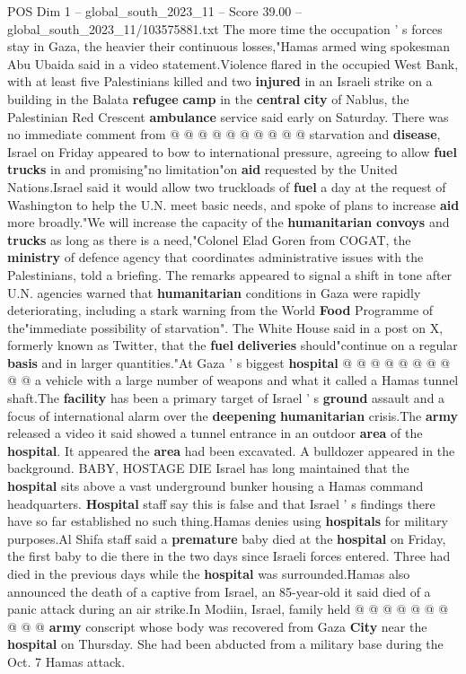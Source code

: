 \begin{textsample}{POS Dim 1 – global\_south\_2023\_11 – Score 39.00 – global\_south\_2023\_11/103575881.txt}
The more time the occupation ' s forces stay in Gaza, the heavier their continuous losses,"Hamas armed wing spokesman Abu Ubaida said in a video statement.Violence flared in the occupied West Bank, with at least five Palestinians killed and two \textbf{injured} in an Israeli strike on a building in the Balata \textbf{refugee} \textbf{camp} in the \textbf{central} \textbf{city} of Nablus, the Palestinian Red Crescent \textbf{ambulance} service said early on Saturday.
There was no immediate comment from @ @ @ @ @ @ @ @ @ @ starvation and \textbf{disease}, Israel on Friday appeared to bow to international pressure, agreeing to allow \textbf{fuel} \textbf{trucks} in and promising"no limitation"on \textbf{aid} requested by the United Nations.Israel said it would allow two truckloads of \textbf{fuel} a day at the request of Washington to help the U.N. meet basic needs, and spoke of plans to increase \textbf{aid} more broadly."We will increase the capacity of the \textbf{humanitarian} \textbf{convoys} and \textbf{trucks} as long as there is a need,"Colonel Elad Goren from COGAT, the \textbf{ministry} of defence agency that coordinates administrative issues with the Palestinians, told a briefing.
The remarks appeared to signal a shift in tone after U.N. agencies warned that \textbf{humanitarian} conditions in Gaza were rapidly deteriorating, including a stark warning from the World \textbf{Food} Programme of the"immediate possibility of starvation".
The White House said in a post on X, formerly known as Twitter, that the \textbf{fuel} \textbf{deliveries} should"continue on a regular \textbf{basis} and in larger quantities."At Gaza ' s biggest \textbf{hospital} @ @ @ @ @ @ @ @ @ @ a vehicle with a large number of weapons and what it called a Hamas tunnel shaft.The \textbf{facility} has been a primary target of Israel ' s \textbf{ground} assault and a focus of international alarm over the \textbf{deepening} \textbf{humanitarian} crisis.The \textbf{army} released a video it said showed a tunnel entrance in an outdoor \textbf{area} of the \textbf{hospital}.
It appeared the \textbf{area} had been excavated.
A bulldozer appeared in the background.
BABY, HOSTAGE DIE Israel has long maintained that the \textbf{hospital} sits above a vast underground bunker housing a Hamas command headquarters. \textbf{Hospital} staff say this is false and that Israel ' s findings there have so far established no such thing.Hamas denies using \textbf{hospitals} for military purposes.Al Shifa staff said a \textbf{premature} baby died at the \textbf{hospital} on Friday, the first baby to die there in the two days since Israeli forces entered.
Three had died in the previous days while the \textbf{hospital} was surrounded.Hamas also announced the death of a captive from Israel, an 85-year-old it said died of a panic attack during an air strike.In Modiin, Israel, family held @ @ @ @ @ @ @ @ @ @ \textbf{army} conscript whose body was recovered from Gaza \textbf{City} near the \textbf{hospital} on Thursday.
She had been abducted from a military base during the Oct. 7 Hamas attack.


\end{textsample}
